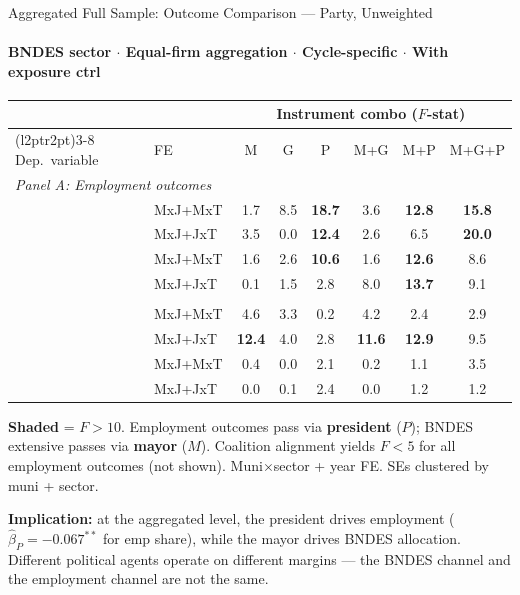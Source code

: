 \documentclass[aspectratio=169,10pt]{beamer}
\newcommand{\fpass}[1]{\cellcolor{pass}\textbf{#1}}
\begin{document}
\begin{frame}[t,shrink=5]{Aggregated Full Sample: Outcome Comparison --- Party, Unweighted}
\framesubtitle{BNDES sector $\cdot$ Equal-firm aggregation $\cdot$ Cycle-specific $\cdot$ With exposure ctrl}
\begin{center}
\footnotesize
\setlength{\tabcolsep}{3.5pt}
\renewcommand{\arraystretch}{1.05}
\begin{tabular}{@{}llcccccc@{}}
\toprule
 & & \multicolumn{6}{c}{Instrument combo ($F$-stat)} \\
\cmidrule(l{2pt}r{2pt}){3-8}
Dep.\ variable & FE & M & G & P & M+G & M+P & M+G+P \\
\midrule
\multicolumn{8}{l}{\textit{Panel A: Employment outcomes}} \\
\addlinespace[3pt]
\multirow{2}{*}{Emp share}
  & MxJ+MxT & 1.7 & 8.5          & \fpass{18.7} & 3.6          & \fpass{12.8} & \fpass{15.8} \\
  & MxJ+JxT & 3.5 & 0.0          & \fpass{12.4} & 2.6          & 6.5          & \fpass{20.0} \\
\addlinespace[2pt]
\multirow{2}{*}{$\log(\text{Emp})$}
  & MxJ+MxT & 1.6 & 2.6          & \fpass{10.6} & 1.6          & \fpass{12.6} & 8.6          \\
  & MxJ+JxT & 0.1 & 1.5          & 2.8          & 8.0          & \fpass{13.7} & 9.1          \\
\addlinespace[6pt]
\multicolumn{8}{l}{\textit{Panel B: BNDES outcomes}} \\
\addlinespace[3pt]
\multirow{2}{*}{BNDES ext.}
  & MxJ+MxT & 4.6 & 3.3          & 0.2          & 4.2          & 2.4          & 2.9          \\
  & MxJ+JxT & \fpass{12.4} & 4.0 & 2.8          & \fpass{11.6} & \fpass{12.9} & 9.5          \\
\addlinespace[2pt]
\multirow{2}{*}{BNDES share}
  & MxJ+MxT & 0.4 & 0.0          & 2.1          & 0.2          & 1.1          & 3.5          \\
  & MxJ+JxT & 0.0 & 0.1          & 2.4          & 0.0          & 1.2          & 1.2          \\
\bottomrule
\end{tabular}
\end{center}
{\scriptsize \colorbox{pass}{\textbf{Shaded}} = $F>10$.
Employment outcomes pass via \textbf{president} ($P$); BNDES extensive passes via \textbf{mayor} ($M$).
Coalition alignment yields $F<5$ for all employment outcomes (not shown).
Muni$\times$sector + year FE.  SEs clustered by muni + sector.}

\vspace{0.3em}
\textcolor{alertred}{\footnotesize\textbf{Implication:} at the aggregated level, the president drives employment ($\hat\beta_P=-0.067^{**}$ for emp share), while the mayor drives BNDES allocation.  Different political agents operate on different margins --- the BNDES channel and the employment channel are not the same.}
\end{frame}
\end{document}

